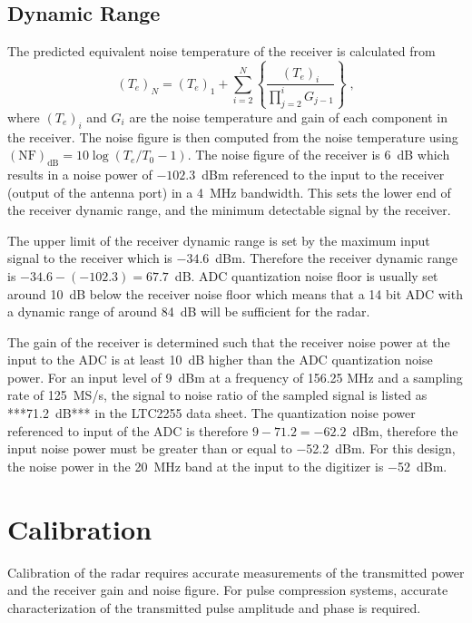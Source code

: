 \documentclass[12pt,letterpaper]{article}
\begin{document}
\subsection{Dynamic Range}

The predicted equivalent noise temperature of the receiver is
calculated from
\begin{equation}
  \left(T_e\right)_N = \left(T_e\right)_1+\sum_{i=2}^{N}\left\{\frac{\left(T_e\right)_i}{\prod_{j=2}^{i}G_{j-1}}\right\}\;,
  \label{eq:noise_temperature}
\end{equation}
where $(T_e)_i$ and $G_i$ are the noise temperature and gain of each
component in the receiver. The noise figure is then computed from the
noise temperature using $(\text{NF})_\text{dB}=10\log(T_e/T_0-1)$. The
noise figure of the receiver is 6~dB which results in a noise power of
$-102.3$~dBm referenced to the input to the receiver (output of the
antenna port) in a 4~MHz bandwidth. This sets the lower end of the
receiver dynamic range, and the minimum detectable signal by the
receiver.

The upper limit of the receiver dynamic range is set by the maximum
input signal to the receiver which is $-34.6$~dBm. Therefore the
receiver dynamic range is $-34.6-(-102.3)=67.7$~dB. ADC quantization
noise floor is usually set around 10~dB below the receiver noise floor
which means that a 14 bit ADC with a dynamic range of around 84~dB
will be sufficient for the radar.

The gain of the receiver is determined such that the receiver noise
power at the input to the ADC is at least 10~dB higher than the ADC
quantization noise power. For an input level of 9~dBm at a frequency
of 156.25 MHz and a sampling rate of 125~MS/s, the signal to noise
ratio of the sampled signal is listed as ***71.2~dB*** in the LTC2255
data sheet. The quantization noise power referenced to input of the
ADC is therefore $9-71.2=-62.2$~dBm, therefore the input noise power
must be greater than or equal to $-$52.2~dBm. For this design, the
noise power in the 20~MHz band at the input to the digitizer is
$-$52~dBm.

\section{Calibration}
\label{sec:calibration}

Calibration of the radar requires accurate measurements of the
transmitted power and the receiver gain and noise figure. For pulse
compression systems, accurate characterization of the transmitted
pulse amplitude and phase is required.
\end{document}
